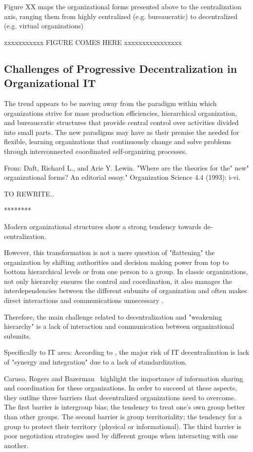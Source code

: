 Figure XX maps the organizational forms presented above to the centralization axis, ranging them from highly centralized (e.g. bureaucratic) to decentralized (e.g. virtual organizations)

 xxxxxxxxxxx  FIGURE COMES HERE xxxxxxxxxxxxxxxx 


\subsection{Challenges of Progressive Decentralization in Organizational IT}

The trend appears to be moving away from the paradigm within which organizations strive for mass production efficiencies, hierarchical organization, and bureaucratic structures that provide central control over activities divided into small parts. The new paradigms may have as their premise the needed for flexible, learning organizations that continuously change and solve problems through interconnected coordinated self-organizing processes.

From: Daft, Richard L., and Arie Y. Lewin. "Where are the theories for the" new" organizational forms? An editorial essay." Organization Science 4.4 (1993): i-vi.

TO REWRITE..

********

Modern organizational structures show a strong tendency towards de-centralization.

However, this transformation is not a mere question of "flattening" the organization by shifting authorities and decision making power from top to bottom hierarchical levels or from one person to a group. In classic organizations, not only hierarchy ensures the control and coordination, it also manages the interdependencies between the different subunits of organization and often makes direct interactions and communications unnecessary \cite{thompson1967}. 

Therefore, the main challenge related to decentralization and "weakening hierarchy" is a lack of interaction and communication between organizational subunits. 

Specifically to IT area: According to \cite{Rockart1996} , the major risk of IT decentralization is lack of  "synergy and integration" due to a lack of standardization. 


Caruso, Rogers and Bazerman~\cite{caruso2008boundaries} highlight the importance of information sharing and coordination for these organizations. In order to succeed at these aspects, they outline three barriers that decentralized organizations need to overcome. The first barrier is intergroup bias; the tendency to treat one's own group better than other groups. The second barrier is group territoriality; the tendency for a group to protect their territory (physical or informational). The third barrier is poor negotiation strategies used by different groups when interacting with one another. 

